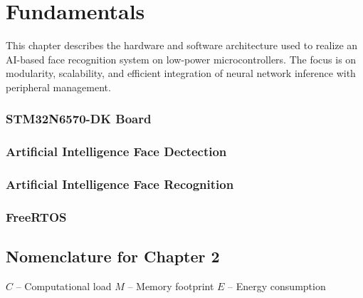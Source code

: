 \chapter{Fundamentals}

This chapter describes the hardware and software architecture used to realize an AI-based face recognition system on low-power microcontrollers. The focus is on modularity, scalability, and efficient integration of neural network inference with peripheral management.


\subsection{STM32N6570-DK Board}
\subsection{Artificial Intelligence Face Dectection}
\subsection{Artificial Intelligence Face Recognition}
\subsection{FreeRTOS}


\section*{Nomenclature for Chapter 2}
$C$ – Computational load  
$M$ – Memory footprint  
$E$ – Energy consumption  
